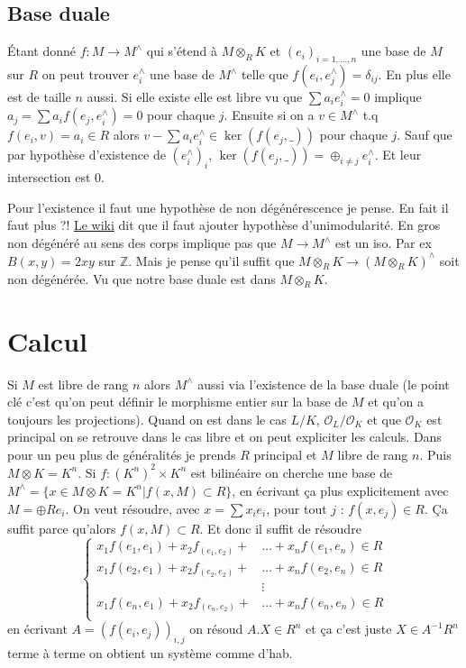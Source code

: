 \documentclass[a4paper,12pt]{book}
\newcommand{\Z}{\mathbb{Z}}
\newcommand{\Or}{\mathcal{O}}
\theoremstyle{plain}
\theoremstyle{definition}
\theoremstyle{remark}
\begin{document}
\subsection{Base duale}
Étant donné $f\colon M\to M^\wedge$ qui s'étend à $M\otimes_R K$
et $(e_i)_{i=1,\ldots,n}$ une base de $M$ sur $R$ on peut trouver
$e_i^\wedge$ une base de $M^\wedge$ telle que
$f(e_i,e_j^\wedge)=\delta_{ij}$. En plus elle est de taille 
$n$ aussi. Si elle existe elle est libre vu que
$\sum a_ie_i^\wedge=0$ implique $a_j=\sum a_if(e_j,e_i^\wedge)=0$
pour chaque $j$. Ensuite si on a $v\in M^\wedge$ t.q 
$f(e_i,v)=a_i\in R$ alors $v-\sum a_ie_i^\wedge\in \ker(f(e_j,\_))$
pour chaque $j$. Sauf que par hypothèse d'existence de $(e_i^\wedge)_i$,
$\ker(f(e_j,\_))=\oplus_{i\ne j} e_i^\wedge$. Et leur intersection 
est $0$. 

Pour l'existence il faut une hypothèse de non dégénérescence je pense.
En fait il faut plus ?! \href{https://en.wikipedia.org/wiki/Bilinear_form#Non-degenerate_bilinear_forms}{Le wiki}
dit que il faut ajouter hypothèse d'unimodularité. En gros 
non dégénéré au sens des corps implique pas que $M\to M^\wedge$
est un iso. Par ex $B(x,y)=2xy$ sur $\Z$. Mais je pense qu'il
suffit que $M\otimes_R K\to (M\otimes_R K)^\wedge$ soit non
dégénérée. Vu que notre base duale est dans $M\otimes_R K$.

\section{Calcul}
Si $M$ est libre de rang $n$ alors $M^\wedge$ aussi via 
l'existence de la base duale (le point clé c'est qu'on peut
définir le morphisme entier sur la base de $M$ et qu'on a toujours
les projections). Quand on est dans le cas $L/K$, $\Or_L/\Or_K$ 
et que $\Or_K$ est principal on se retrouve dans le cas libre et
on peut expliciter les calculs. Dans pour un peu plus de généralités
je prends $R$ principal et $M$ libre de rang $n$. Puis $M\otimes K=K^n$.
Si $f\colon (K^n)^2\times K^n$ est bilinéaire on cherche une base de
$M^\wedge=\{x\in M\otimes K=K^n|f(x,M)\subset R\}$, en écrivant ça plus
explicitement avec $M=\oplus Re_i$. On veut résoudre, avec $x=\sum x_ie_i$,
pour tout $j$ : $f(x,e_j)\in R$. Ça suffit parce qu'alors $f(x,M)\subset R$.
Et donc il suffit de résoudre 
\[\begin{cases}x_1f(e_1,e_1)+x_2f_(e_1,e_2)+&\ldots+x_nf(e_1,e_n)\in R\\
x_1f(e_2,e_1)+x_2f_(e_2,e_2)+&\ldots+x_nf(e_2,e_n)\in R\\
                             &\vdots\\
x_1f(e_n,e_1)+x_2f_(e_n,e_2)+&\ldots+x_nf(e_n,e_n)\in R\\
\end{cases}\]
en écrivant $A=(f(e_i,e_j))_{i,j}$ on résoud $A.X\in R^n$ et ça
c'est juste $X\in A^{-1}R^n$ terme à terme on obtient un système
comme d'hab.
\end{document}

